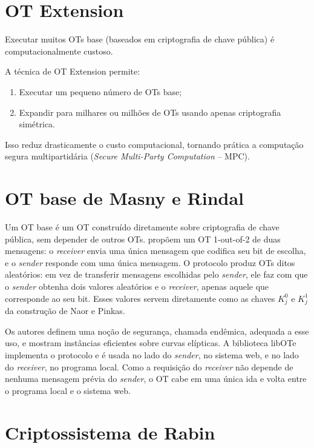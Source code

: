 \section{OT Extension}

Executar muitos OTs base (baseados em criptografia de chave pública) é
computacionalmente custoso.

A técnica de OT Extension permite:

\begin{enumerate}
\item Executar um pequeno número de OTs base;
\item Expandir para milhares ou milhões de OTs usando apenas criptografia
simétrica.
\end{enumerate}

Isso reduz drasticamente o custo computacional, tornando prática a computação segura multipartidária (\emph{Secure Multi-Party Computation} -- MPC).

\section{OT base de Masny e Rindal}\label{sec:mr19}

Um OT base é um OT construído diretamente sobre criptografia de chave pública,
sem depender de outros OTs.  propõem um OT
1-out-of-2 de duas mensagens: o \emph{receiver} envia uma única mensagem que
codifica seu bit de escolha, e o \emph{sender} responde com uma única
mensagem. O protocolo produz OTs ditos aleatórios: em vez de transferir
mensagens escolhidas pelo \emph{sender}, ele faz com que o \emph{sender} obtenha
dois valores aleatórios e o \emph{receiver}, apenas aquele que corresponde ao
seu bit. Esses valores servem diretamente como as chaves $K_j^0$ e $K_j^1$ da
construção de Naor e Pinkas.

Os autores definem uma noção de segurança, chamada endêmica, adequada a esse
uso, e mostram instâncias eficientes sobre curvas elípticas. A biblioteca
libOTe \cite{libote} implementa o protocolo e é usada no lado do
\emph{sender}, no sistema web, e no lado do \emph{receiver}, no programa local.
Como a requisição do \emph{receiver} não depende de nenhuma mensagem prévia do
\emph{sender}, o OT cabe em uma única ida e volta entre o programa local e o
sistema web.


\section{Criptossistema de Rabin}

